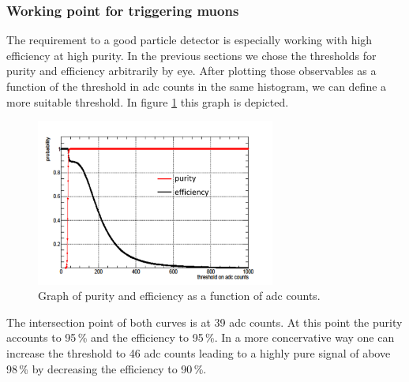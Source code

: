 		\subsubsection{Working point for triggering muons}
		\label{working_point}
			The requirement to a good particle detector is especially working with high efficiency at high purity.
			In the previous sections we chose the thresholds for purity and efficiency arbitrarily by eye.
			After plotting those observables as a function of the threshold in adc counts in the same histogram, we can define a more suitable threshold.
			In figure \ref{fig:pur_eff} this graph is depicted.
			\begin{figure}[htbp]
				\centering
				\includegraphics[width=0.70\textwidth]{Figures/erdogan/pur_eff.png}
				\caption{Graph of purity and efficiency as a function of adc counts.}
				\label{fig:pur_eff}
			\end{figure}
			The intersection point of both curves is at 39 adc counts.
			At this point the purity accounts to 95\,\% and the efficiency to 95\,\%.
			In a more concervative way one can increase the threshold to 46 adc counts leading to a highly pure signal of above 98\,\% by decreasing the efficiency to 90\,\%.